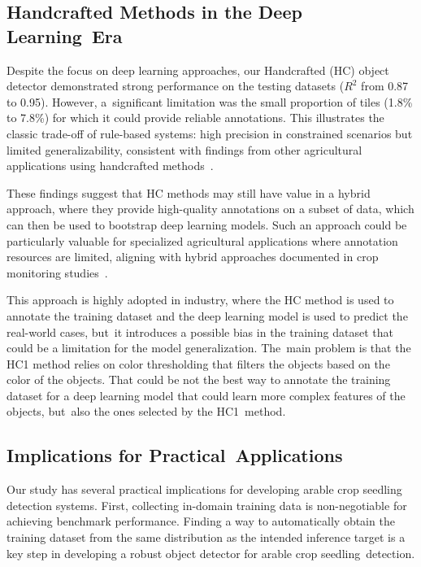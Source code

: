 \documentclass[12pt,a4paper,oneside]{report}
\begin{document}
\subsection{Handcrafted Methods in the Deep Learning~Era}
Despite the focus on deep learning approaches, our Handcrafted (HC) object detector 
demonstrated strong performance on the testing datasets ($R^2$ from 0.87 to 0.95). 
However, a~significant limitation was the small proportion of tiles (1.8\% to 7.8\%) 
for which it could provide reliable annotations. This illustrates the classic trade-off 
of rule-based systems: high precision in constrained scenarios but limited generalizability, 
consistent with findings from other agricultural applications using handcrafted methods~\cite{garcia-martinezDigitalCountCorn2020,zhang2020cut}.

These findings suggest that HC methods may still have value in a hybrid approach, where 
they provide high-quality annotations on a subset of data, which can then be used to 
bootstrap deep learning models. Such an approach could be particularly valuable for 
specialized agricultural applications where annotation resources are limited, aligning 
with hybrid approaches documented in crop monitoring studies~\cite{torres-sanchez_early_2021}.

This approach is highly adopted in industry, where the HC method is used to
annotate the training dataset and the deep learning model is used to predict the real-world
cases, but~it introduces a possible bias in the training dataset that could be a limitation
for the model generalization. The~main problem is that the HC1 method relies
on color thresholding that filters the 
objects based on the color of the objects. That could be not the best
way to annotate the training dataset for a deep learning model that could learn
more complex features of the objects, but~also the ones selected by the HC1~method.

\subsection{Implications for Practical~Applications}
Our study has several practical implications for developing arable crop seedling detection systems.
First, collecting in-domain training data is non-negotiable for achieving benchmark performance. 
Finding a way to automatically obtain the training dataset from the same distribution as the intended 
inference target is a key step in developing a robust object detector for arable crop seedling~detection.
\end{document}

